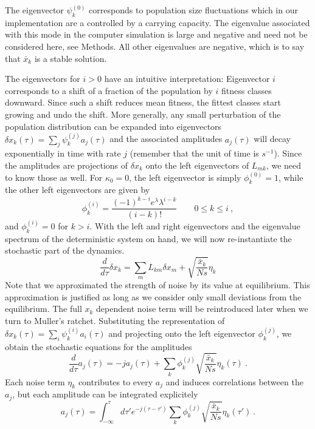 \documentclass[rmp,preprint]{revtex4}
\newcommand{\x}{x}
\newcommand{\xs}{\bar{\x}}
\newcommand{\dx}{\delta \x}
\newcommand{\mr}[1]{\psi^{(#1)}}
\newcommand{\ml}[1]{\phi^{(#1)}}
\begin{document}
The eigenvector $\mr{0}_k$ corresponds to population size fluctuations which in our implementation are a controlled by a carrying capacity. The eigenvalue associated with this mode in the computer simulation is large and negative and need not be considered here, see Methods.  All other eigenvalues are negative, which is to say that $\xs_k$ is a stable solution.

The eigenvectors for $i>0$ have an intuitive interpretation: Eigenvector $i$ corresponds to a shift of a fraction of the population by $i$ fitness classes downward. Since such a shift reduces mean fitness, the fittest classes start growing and undo the shift. More generally, any small perturbation of the population distribution can be expanded into eigenvectors $\dx_k(\tau) = \sum_j \mr{j}_k a_j(\tau)$ and the associated amplitudes $a_j(\tau)$ will decay exponentially in time with rate $j$ (remember that the unit of time is $s^{-1}$). Since the amplitudes are projections of $\dx_k$ onto the left eigenvectors of $L_{mk}$, we need to know those as well. For $\kappa_0=0$, the left eigenvector is simply $\ml{0}_k=1$, while the other left eigenvectors are given by
\begin{equation}
\ml{i}_k=\frac{(-1)^{k-i}e^{\lambda}\lambda^{i-k}}{(i-k)!} \quad\quad 0\leq k \leq i \ ,
\end{equation}
and $\ml{i}_k=0$ for $k>i$. With the left and right eigenvectors and the eigenvalue spectrum of the deterministic system on hand, we will now re-instantiate the stochastic part of the dynamics. 
\begin{equation}
\frac{d}{d\tau} \dx_k = \sum_m L_{km}\dx_m + \sqrt{\frac{\xs_k}{Ns}}\eta_k
\end{equation}
Note that we approximated the strength of noise by its value at equilibrium. This approximation is justified as long as we consider only small deviations from the equilibrium. The full $\x_k$ dependent noise term will be reintroduced later when we turn to Muller's ratchet. Substituting the representation of $\dx_k(\tau) = \sum_i \mr{i}_k a_i(\tau)$ and projecting onto the left eigenvector $\ml{j}_k$, we obtain the stochastic equations for the amplitudes
\begin{equation}
\label{eq:modes}
\frac{d}{d\tau} a_j(\tau) = -j a_j(\tau) + \sum_k \ml{j}_k \sqrt{\frac{\xs_k}{Ns}} \eta_k(\tau) \ .
\end{equation}
Each noise term $\eta_k$ contributes to every $a_j$ and induces correlations between the $a_j$, but each amplitude can be integrated explicitely
\begin{equation}
a_j(\tau) = \int_{-\infty}^{\tau}d\tau' e^{-j(\tau-\tau')} \sum_k \ml{j}_k \sqrt{\frac{\xs_k}{Ns}} \eta_k(\tau') \ .
\end{equation}
\end{document}

